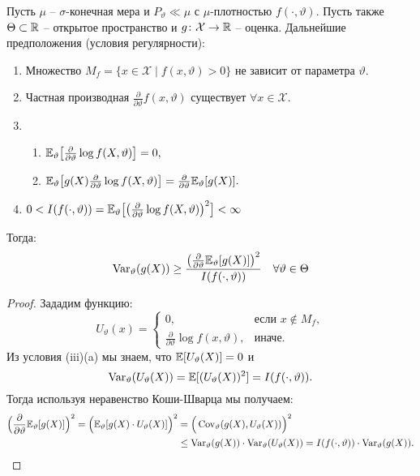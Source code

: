 \begin{thm} \label{Cramer-Rao inequality} 
	Пусть $\mu$ -- $\sigma$-конечная мера и $P_\vartheta \ll \mu$ с $\mu$-плотностью $f(\cdot, \vartheta)$. Пусть также $\Theta \subset \mathbb{R}$ -- открытое пространство и $g\colon\mathcal{X} \rightarrow \mathbb{R}$ -- оценка.
	Дальнейшие предположения (условия регулярности):
	\begin{enumerate}
		\item Множество $M_f=\{ x \in \mathcal{X} \mid f(x, \vartheta) > 0 \}$ не зависит от параметра $\vartheta$.
		\item Частная производная $ \frac{\partial}{\partial \vartheta} f(x, \vartheta)$ существует $\forall x \in \mathcal{X}$.
		\item 
		\begin{enumerate}
		\item $\mathbb{E}_\vartheta \big[\frac{\partial}{\partial \vartheta} \log f(X, \vartheta)\big] = 0,$
		\item $\mathbb{E}_\vartheta \big[g(X) \frac{\partial}{\partial \vartheta} \log f(X, \vartheta)\big] = \frac{\partial}{\partial \vartheta} \mathbb{E}_\vartheta[g(X)].$
	    \end{enumerate}
		\item $0<I(f(\cdot, \vartheta))=\mathbb{E}_\vartheta \big[\big(\frac{\partial}{\partial \vartheta} \log f(X, \vartheta)\big)^2\big]<\infty$
	\end{enumerate}
	Тогда:
	\begin{equation} \label{eq2.2}
	\operatorname{Var}_\vartheta(g(X)) \geq \frac{\big(\frac{\partial}{\partial \vartheta} \mathbb{E}_\vartheta[g(X)]\big)^2}{I(f(\cdot, \vartheta))} \quad \forall \vartheta \in \Theta
	\end{equation}
\end{thm}
\begin{proof}
	Зададим функцию:
	\[ U_\vartheta(x)=
	\left\{
	\begin{array}{ll}
	0, & \text{если } x \notin M_f, \\
	\frac{\partial}{\partial \vartheta} \log f(x, \vartheta), & \text{иначе.}
	\end{array}
	\right.
	\]
	Из условия (iii)(a) мы знаем, что $\mathbb{E}[U_\vartheta(X)]=0$ и
	\[ \operatorname{Var}_\vartheta(U_\vartheta(X))=\mathbb{E}[(U_\vartheta(X))^2]=I(f(\cdot, \vartheta)). \]
	Тогда используя неравенство Коши-Шварца мы получаем:
	\[
	\begin{aligned}
	\Big( \frac{\partial}{\partial \vartheta} \mathbb{E}_\vartheta[g(X)] \Big)^2 = \Big( \mathbb{E}_\vartheta[g(X) \cdot U_\vartheta(X)] \Big)^2  & = \Big(\operatorname{Cov}_\vartheta(g(X), U_\vartheta(X)) \Big)^2 \\
	& \leq \operatorname{Var}_\vartheta(g(X))\cdot \operatorname{Var}_\vartheta(U_\vartheta(X))=
	I(f(\cdot, \vartheta))\cdot \operatorname{Var}_\vartheta(g(X)).
	\end{aligned}
	  \]
\end{proof}

